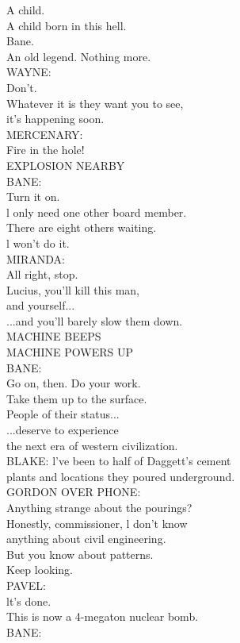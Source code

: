 \documentclass{article}
\begin{document}
\begin{multicols}{3}
A child.\\
A child born in this hell.\\
Bane.\\
An old legend. Nothing more.\\
WAYNE:\\
Don't.\\
Whatever it is they want you to see,\\
it's happening soon.\\
MERCENARY:\\
Fire in the hole!\\
EXPLOSION NEARBY\\
BANE:\\
Turn it on.\\
l only need one other board member.\\
There are eight others waiting.\\
l won't do it.\\
MIRANDA:\\
All right, stop.\\
Lucius, you'll kill this man,\\
and yourself...\\
...and you'll barely slow them down.\\
MACHINE BEEPS\\
MACHINE POWERS UP\\
BANE:\\
Go on, then. Do your work.\\
Take them up to the surface.\\
People of their status...\\
...deserve to experience\\
the next era of western civilization.\\
BLAKE: l've been to half of Daggett's cement\\
plants and locations they poured underground.\\
GORDON OVER PHONE:\\
Anything strange about the pourings?\\
Honestly, commissioner, l don't know\\
anything about civil engineering.\\
But you know about patterns.\\
Keep looking.\\
PAVEL:\\
lt's done.\\
This is now a 4-megaton nuclear bomb.\\
BANE:\\

\end{multicols}
\end{document}
